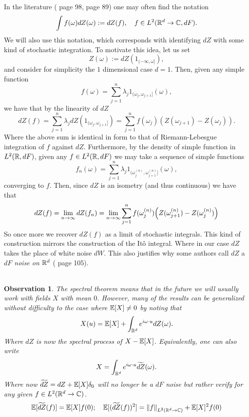 \documentclass[12pt]{article}
\newtheorem{observation}{Observation}
\begin{document}
In the literature (\cite{yaglom1987correlation} page 98, \cite{lindgren2012stationary} page 89) one may often find the notation
\begin{equation*}
    \int f(\omega)dZ(\omega):=dZ(f),\quad f\in L^2({\mathbb R}^d\to\mathbb{C},dF).
\end{equation*}
We will also use this notation, which corresponds with identifying $dZ$ with some kind of stochastic integration. To motivate this idea, let us set
\begin{equation}\label{Z def}
    Z(\omega):=dZ(1_{(-\infty,\omega]}),
\end{equation}
and consider for simplicity the $1$ dimensional case $d=1$. Then, given any simple function
$$f(\omega)=\sum_{j=1}^{n}  \lambda_{j} 1_{(\omega_j,\omega_{j+1}]}(\omega),$$
we have that by the linearity of $dZ$
\begin{equation*}
    dZ(f)=\sum_{j=1}^n\lambda_j dZ(1_{(\omega_j,\omega_{j+1}]})=\sum_{j=1}^n f(\omega_j) (Z(\omega_{j+1})-Z(\omega_j)).
\end{equation*}
Where the above sum is identical in form to that of Riemann-Lebesgue integration of $f$ against $dZ$. Furthermore, by the density of simple function in $L^2({\mathbb R},dF)$, given any $f\in L^2({\mathbb R},dF)$ we may take a sequence of simple functions $$f_n(\omega)=\sum_{j=1}^{n}  \lambda_{j} 1_{(\omega_j^{(n)},\omega^{(n)}_{j+1}]}(\omega),$$ converging to $f$. Then, since $dZ$ is an isometry (and thus continuous) we have that
\begin{equation}\label{approx stoch int}
    dZ(f)=\lim_{n\to\infty} dZ(f_n)=\lim_{n\to\infty}\sum_{j=1}^n f(\omega^{(n)}_j)\qty (Z(\omega^{(n)}_{j+1})-Z(\omega^{(n)}_j))
\end{equation}
So once more we recover $dZ(f)$ as a limit of stochastic integrals. This kind of construction mirrors the construction of the Itô integral. Where in our case $dZ$ takes the place of white noise $dW$. This also justifies why some authors call $dZ$ a \emph{$dF$ noise on ${\mathbb R}^d$} (\cite{adler2007random} page 105).\\
\\
\begin{observation}\label{obs 1}
    The spectral theorem means that in the future we will usually work with fields $X$ with mean $0$. However, many of the results can be generalized without difficulty to the case where $\mathbb{E}[X]\neq 0$ by noting that
    \begin{equation*}
        X(u)=\mathbb{E}[X]+\int_{{\mathbb R}^d}e^{i\omega\cdot u}dZ(\omega).
    \end{equation*}
    Where $dZ$ is now the spectral process of $X-\mathbb{E}[X]$. Equivalently, one can also write
    \begin{equation*}
        X=\int_{{\mathbb R}^d}e^{i\omega\cdot u}\widetilde{dZ}(\omega).
    \end{equation*}
    Where now $\widetilde{dZ}=dZ+\mathbb{E}[X]\delta_0$ will no longer be a $dF$ noise but rather verify for any given $f\in L^2({\mathbb R}^d\to\mathbb{C})$.
    \begin{equation*}
        \mathbb{E}[\widetilde{dZ}(f)]=\mathbb{E}[X]f(0);\quad \mathbb{E}[(\widetilde{dZ}(f))^2]=\norm{f}_{L^2({\mathbb R}^d\to\mathbb{C})}+\mathbb{E}[X]^2f(0)
    \end{equation*}
\end{observation}
\end{document}
